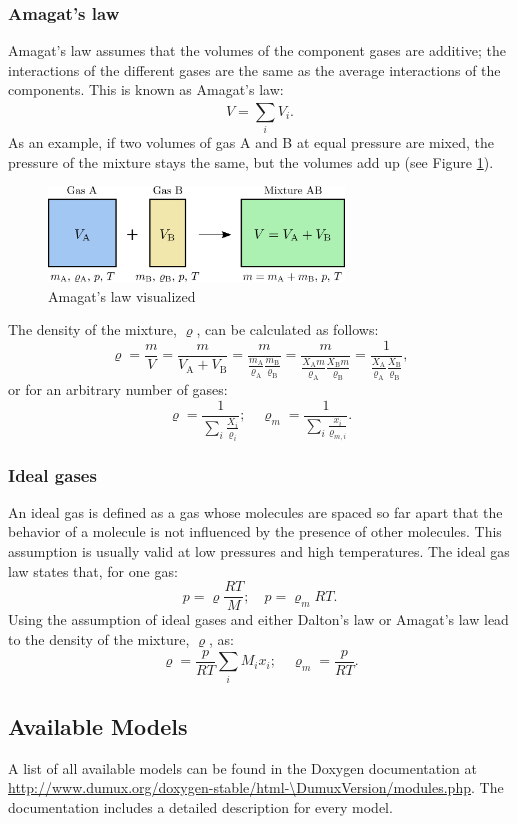 \subsubsection{Amagat's law}
Amagat's law assumes that the volumes of the component gases are additive; the interactions of the different gases are the same as the average interactions of the components. This is known as Amagat's law:
%
\begin{equation}
V = \sum_{i}^{}V_i.
\end{equation}
%
As an example, if two volumes of gas A and B at equal pressure are mixed, the pressure of the mixture stays the same, but the volumes add up (see Figure \ref{fig:dalton2}).
%
\begin{figure}[ht]
  \centering
  \includegraphics[width=0.7\textwidth]{png/dalton2.png}
  \caption{Amagat's law visualized}
  \label{fig:dalton2}
\end{figure}
%
The density of the mixture, $\varrho$, can be calculated as follows:
\begin{equation}
\varrho = \frac{m}{V} = \frac{m}{V_\mathrm{A} + V_\mathrm{B}} = \frac{m}{\frac{m_\mathrm{A}}{\varrho_\mathrm{A}} \frac{m_\mathrm{B}}{\varrho_\mathrm{B}}} =
\frac{m}{\frac{X_\mathrm{A} m}{\varrho_\mathrm{A}} \frac{X_\mathrm{B} m}{\varrho_\mathrm{B}}} = \frac{1}{\frac{X_\mathrm{A}}{\varrho_\mathrm{A}} \frac{X_\mathrm{B}}{\varrho_\mathrm{B}}},
\end{equation}
%
or for an arbitrary number of gases:
%
\begin{equation}
\varrho = \frac{1}{\sum_{i}^{}\frac{X_i}{\varrho_i}}  ; \quad  \varrho_m = \frac{1}{\sum_{i}^{}\frac{x_i}{\varrho_{m,i}}}.
\end{equation}
%
\subsubsection{Ideal gases}
An ideal gas is defined as a gas whose molecules are spaced so far apart that the behavior of a molecule is not influenced by the presence of other molecules.
This assumption is usually valid at low pressures and high temperatures. The ideal gas law states that, for one gas:
%
\begin{equation}
p = \varrho \frac{RT}{M} ; \quad p= \varrho_m RT.
\end{equation}
%
Using the assumption of ideal gases and either Dalton's law or Amagat's law lead to the density of the mixture, $\varrho$, as:
%
\begin{equation}
\varrho = \frac{p}{RT} \sum_{i}^{}M_i x_i ; \quad \varrho_m = \frac{p}{RT}.
\end{equation}
%
\subsection{Available Models}
A list of all available models can be found
in the Doxygen documentation at
\url{http://www.dumux.org/doxygen-stable/html-\DumuxVersion/modules.php}.
The documentation includes a detailed description for every model.
